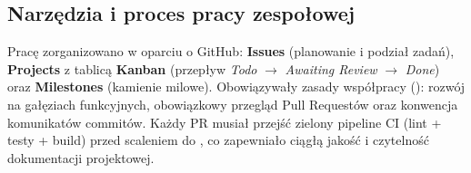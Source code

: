 \subsection{Narzędzia i proces pracy zespołowej}

Pracę zorganizowano w oparciu o GitHub: \textbf{Issues} (planowanie i podział zadań),
\textbf{Projects} z tablicą \textbf{Kanban} (przepływ \emph{Todo} $\rightarrow$
\emph{Awaiting Review} $\rightarrow$ \emph{Done}) oraz \textbf{Milestones} (kamienie
milowe). Obowiązywały zasady współpracy (): rozwój na gałęziach
funkcyjnych, obowiązkowy przegląd Pull Requestów oraz konwencja komunikatów commitów.
Każdy PR musiał przejść zielony pipeline CI (lint + testy + build) przed scaleniem do
, co zapewniało ciągłą jakość i czytelność dokumentacji projektowej.
